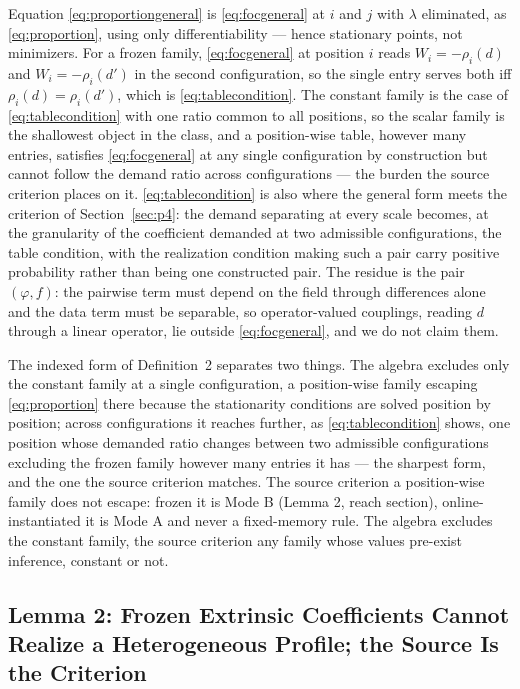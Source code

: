 \argument Equation \eqref{eq:proportiongeneral} is \eqref{eq:focgeneral} at $i$ and $j$ with $\lambda$ eliminated, as \eqref{eq:proportion}, using only differentiability --- hence stationary points, not minimizers. For a frozen family, \eqref{eq:focgeneral} at position $i$ reads $W_i = -\rho_i(d)$ and $W_i = -\rho_i(d')$ in the second configuration, so the single entry serves both iff $\rho_i(d) = \rho_i(d')$, which is \eqref{eq:tablecondition}. The constant family is the case of \eqref{eq:tablecondition} with one ratio common to all positions, so the scalar family is the shallowest object in the class, and a position-wise table, however many entries, satisfies \eqref{eq:focgeneral} at any single configuration by construction but cannot follow the demand ratio across configurations --- the burden the source criterion places on it. \eqref{eq:tablecondition} is also where the general form meets the criterion of Section~\ref{sec:p4}: the demand separating at every scale becomes, at the granularity of the coefficient demanded at two admissible configurations, the table condition, with the realization condition making such a pair carry positive probability rather than being one constructed pair. The residue is the pair $(\varphi, f)$: the pairwise term must depend on the field through differences alone and the data term must be separable, so operator-valued couplings, reading $d$ through a linear operator, lie outside \eqref{eq:focgeneral}, and we do not claim them.\qedbox

The indexed form of Definition~2 separates two things. The algebra excludes only the constant family at a single configuration, a position-wise family escaping \eqref{eq:proportion} there because the stationarity conditions are solved position by position; across configurations it reaches further, as \eqref{eq:tablecondition} shows, one position whose demanded ratio changes between two admissible configurations excluding the frozen family however many entries it has --- the sharpest form, and the one the source criterion matches. The source criterion a position-wise family does not escape: frozen it is Mode B (Lemma 2, reach section), online-instantiated it is Mode A and never a fixed-memory rule. The algebra excludes the constant family, the source criterion any family whose values pre-exist inference, constant or not.

\subsection{Lemma 2: Frozen Extrinsic Coefficients Cannot Realize a Heterogeneous Profile; the Source Is the Criterion}

